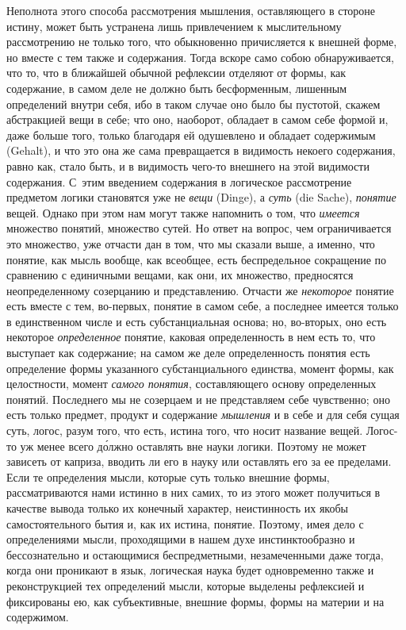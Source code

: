 Неполнота этого способа рассмотрения мышления, оставляющего в стороне
истину, может быть устранена лишь привлечением к мыслительному рассмотрению
не только того, что обыкновенно причисляется к внешней форме, но вместе с
тем также и содержания. Тогда вскоре само собою обнаруживается, что то, что
в ближайшей обычной рефлексии отделяют от формы, как содержание, в самом
деле не должно быть бесформенным, лишенным определений внутри себя, ибо в
таком случае оно было бы пустотой, скажем абстракцией вещи в себе; что оно,
наоборот, обладает в самом себе формой и, даже больше того, только
благодаря ей одушевлено и обладает содержимым (Gehalt), и что это она же
сама превращается в видимость некоего содержания, равно как, стало быть, и
в видимость чего-то внешнего на этой видимости содержания. С~этим введением
содержания в логическое рассмотрение предметом логики становятся уже не
{\em вещи} (Dinge), а {\em суть}
(die Sache), {\em понятие} вещей. Однако при этом нам
могут также напомнить о том, что {\em имеется}
множество понятий, множество сутей. Но ответ на вопрос, чем ограничивается
это множество, уже отчасти дан в том, что мы сказали выше, а именно, что
понятие, как мысль вообще, как всеобщее, есть беспредельное сокращение по
сравнению с единичными вещами, как они, их множество, предносятся
неопределенному созерцанию и представлению. Отчасти же
{\em некоторое} понятие есть вместе с тем, во-первых,
понятие в самом себе, а последнее имеется только в единственном числе и
есть субстанциальная основа; но, во-вторых, оно есть некоторое
{\em определенное} понятие, каковая определенность в
нем есть то, что выступает как содержание; на самом же деле определенность
понятия есть определение формы указанного субстанциального единства, момент
формы, как целостности, момент {\em самого понятия},
составляющего основу определенных понятий. Последнего мы не созерцаем и не
представляем себе чувственно; оно есть только предмет, продукт и содержание
{\em мышления} и в себе и для себя сущая суть, логос,
разум того, что есть, истина того, что носит название вещей. Логос-то уж
менее всего д\'{о}лжно оставлять вне науки логики. Поэтому не может зависеть от
каприза, вводить ли его в науку или оставлять его за ее пределами. Если те
определения мысли, которые суть только внешние формы, рассматриваются нами
истинно в них самих, то из этого может получиться в качестве вывода только
их конечный характер, неистинность их якобы самостоятельного бытия и, как
их истина, понятие. Поэтому, имея дело с определениями мысли, проходящими в
нашем духе инстинктообразно и бессознательно и остающимися беспредметными,
незамеченными даже тогда, когда они проникают в язык, логическая наука
будет одновременно также и реконструкцией тех определений мысли, которые
выделены рефлексией и фиксированы ею, как субъективные, внешние формы,
формы на материи и на содержимом.

